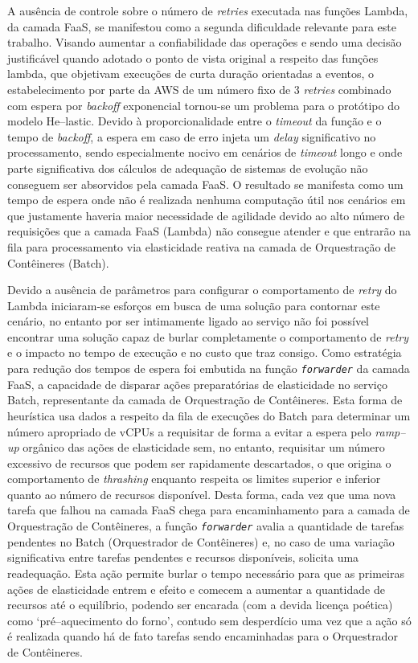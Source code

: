 \documentclass[english,brazilian]{UNISINOSmonografia} %
\begin{document}
A ausência de controle sobre o número de \textit{retries} executada nas funções Lambda, da camada FaaS, se manifestou como a segunda dificuldade relevante para este trabalho.
%
Visando aumentar a confiabilidade das operações e sendo uma decisão justificável quando adotado o ponto de vista original a respeito das funções lambda, que objetivam execuções de curta duração orientadas a eventos, o estabelecimento por parte da AWS de um número fixo de 3 \textit{retries} combinado com espera por \textit{backoff} exponencial tornou-se um problema para o protótipo do modelo \textsf{He}--lastic.
%
Devido à proporcionalidade entre o \textit{timeout} da função e o tempo de \textit{backoff}, a espera em caso de erro injeta um \textit{delay} significativo no processamento, sendo especialmente nocivo em cenários de \textit{timeout} longo e onde parte significativa dos cálculos de adequação de sistemas de evolução não conseguem ser absorvidos pela camada FaaS.
%
O resultado se manifesta como um tempo de espera onde não é realizada nenhuma computação útil nos cenários em que justamente haveria maior necessidade de agilidade devido ao alto número de requisições que a camada FaaS (Lambda) não consegue atender e que entrarão na fila para processamento via elasticidade reativa na camada de Orquestração de Contêineres (Batch).



Devido a ausência de parâmetros para configurar o comportamento de \textit{retry} do Lambda iniciaram-se esforços em busca de uma solução para contornar este cenário, no entanto por ser intimamente ligado ao serviço não foi possível encontrar uma solução capaz de burlar completamente o comportamento de \textit{retry} e o impacto no tempo de execução e no custo que traz consigo.
%
Como estratégia para redução dos tempos de espera foi embutida na função \texttt{\textit{forwarder}} da camada FaaS, a capacidade de disparar ações preparatórias de elasticidade no serviço Batch, representante da camada de Orquestração de Contêineres.
%
Esta forma de heurística usa dados a respeito da fila de execuções do Batch para determinar um número apropriado de vCPUs a requisitar de forma a evitar a espera pelo \textit{ramp--up} orgânico das ações de elasticidade sem, no entanto, requisitar um número excessivo de recursos que podem ser rapidamente descartados, o que origina o comportamento de \textit{thrashing} enquanto respeita os limites superior e inferior quanto ao número de recursos disponível.
%
Desta forma, cada vez que uma nova tarefa que falhou na camada FaaS chega para encaminhamento para a camada de Orquestração de Contêineres, a função \texttt{\textit{forwarder}} avalia a quantidade de tarefas pendentes no Batch (Orquestrador de Contêineres) e, no caso de uma variação significativa entre tarefas pendentes e recursos disponíveis, solicita uma readequação.
%
Esta ação permite burlar o tempo necessário para que as primeiras ações de elasticidade entrem e efeito e comecem a aumentar a quantidade de recursos até o equilíbrio, podendo ser encarada (com a devida licença poética) como \textquoteleft pré--aquecimento do forno\textquoteright, contudo sem desperdício uma vez que a ação só é realizada quando há de fato tarefas sendo encaminhadas para o Orquestrador de Contêineres.
\end{document}
